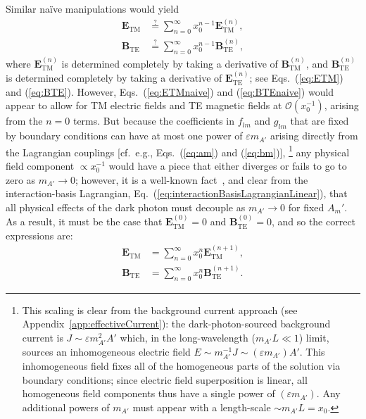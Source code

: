 \documentclass[amsmath,amssymb,aps,10pt,prd,letterpaper,nofootinbib,balancelastpage,notitlepage,superscriptaddress,twocolumn,floatfix]{revtex4-2}
\newcommand{\appref}[2][x]{Appendi{#1}~\ref{#2}}	%
\renewcommand{\eqref}[2][]{Eq{#1}.~(\ref{eq:#2})}	%
\begin{document}
Similar na\"ive manipulations would yield
\begin{align}
    \bm E_\text{TM}&\stackrel{?}{=}\sum_{n=0}^{\infty} x_0^{n-1} \bm E_\text{TM}^{(n)}, \label{eq:ETMnaive} \\
    \bm B_\text{TE}&\stackrel{?}{=}\sum_{n=0}^{\infty} x_0^{n-1} \bm B_\text{TE}^{(n)},\label{eq:BTEnaive}
\end{align}
where $\bm{E}_\text{TM}^{(n)}$ is determined completely by taking a derivative of $\bm{B}_\text{TM}^{(n)}$, and $\bm{B}_\text{TE}^{(n)}$ is determined completely by taking a derivative of $\bm{E}_\text{TE}^{(n)}$; see \eqref[s]{ETM} and (\ref{eq:BTE}).
However, \eqref[s]{ETMnaive} and (\ref{eq:BTEnaive}) would appear to allow for TM electric fields and TE magnetic fields at $\mathcal{O}(x_0^{-1})$, arising from the $n=0$ terms.
But because the coefficients in $f_{lm}$ and $g_{lm}$ that are fixed by boundary conditions can have at most one power of $\varepsilon m_{A'}$ arising directly from the Lagrangian couplings [cf.~e.g., \eqref[s]{am} and (\ref{eq:bm})],%
\footnote{\label{ftnt:scalingArgument}%
    This scaling is clear from the background current approach (see \appref{app:effectiveCurrent}): the dark-photon-sourced background current is $J \sim \varepsilon m_{A'}^2 A'$ which, in the long-wavelength ($m_{A'}L\ll 1$) limit, sources an inhomogeneous electric field $E\sim m_{A'}^{-1} J \sim ( \varepsilon m_{A'} ) A'$. 
    This inhomogeneous field fixes all of the homogeneous parts of the solution via boundary conditions; since electric field superposition is linear, all homogeneous field components thus have a single power of $( \varepsilon m_{A'} )$.
    Any additional powers of $m_{A'}$ must appear with a length-scale $\sim m_{A'}L = x_0$.
} %
any physical field component $\propto x_0^{-1}$ would have a piece that either diverges or fails to go to zero as $m_{A'} \rightarrow 0$; however, it is a well-known fact~\cite{Holdom:1985ag}, and clear from the interaction-basis Lagrangian, \eqref{interactionBasisLagrangianLinear}, that all physical effects of the dark photon must decouple as $m_{A'} \rightarrow 0$ for fixed $A_m'$. 
As a result, it must be the case that $\bm{E}_\text{TM}^{(0)}=0$ and $\bm{B}_\text{TE}^{(0)}=0$, and so the correct expressions are:
\begin{align}
    \bm E_\text{TM}&=\sum_{n=0}^{\infty} x_0^{n} \bm E_\text{TM}^{(n+1)},\\
    \bm B_\text{TE}&=\sum_{n=0}^{\infty} x_0^{n} \bm B_\text{TE}^{(n+1)}.
\end{align}
\end{document}
